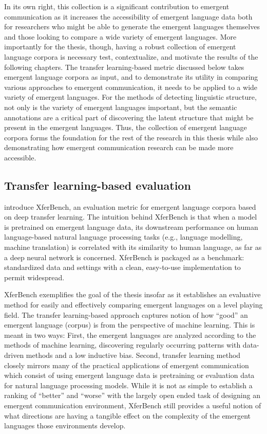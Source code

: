 In its own right, this collection is a significant contribution to emergent communication as it increases the accessibility of emergent language data both for researchers who might be able to generate the emergent languages themselves and those looking to compare a wide variety of emergent languages.
More importantly for the thesis, though, having a robust collection of emergent language corpora is necessary test, contextualize, and motivate the results of the following chapters.
The transfer learning-based metric discussed below takes emergent language corpora as input, and to demonstrate its utility in comparing various approaches to emergent communication, it needs to be applied to a wide variety of emergent languages.
For the methods of detecting linguistic structure, not only is the variety of emergent languages important, but the semantic annotations are a critical part of discovering the latent structure that might be present in the emergent languages.
Thus, the collection of emergent language corpora forms the foundation for the rest of the research in this thesis while also demonstrating how emergent communication research can be made more accessible.

\subsection{Transfer learning-based evaluation}

 introduce XferBench, an evaluation metric for emergent language corpora based on deep transfer learning.
The intuition behind XferBench is that when a model is pretrained on emergent language data, its downstream performance on human language-based natural language processing tasks (e.g., language modelling, machine translation) is correlated with its similarity to human language, as far as a deep neural network is concerned.
XferBench is packaged as a benchmark: standardized data and settings with a clean, easy-to-use implementation to permit widespread.

XferBench exemplifies the goal of the thesis insofar as it establishes an evaluative method for easily and effectively comparing emergent languages on a level playing field.
The transfer learning-based approach captures notion of how ``good'' an emergent language (corpus) is from the perspective of machine learning.
This is meant in two ways:
  First, the emergent languages are analyzed according to the methods of machine learning, discovering regularly occurring patterns with data-driven methods and a low inductive bias.
  Second, transfer learning method closely mirrors many of the practical applications of emergent communication which consist of using emergent language data is pretraining or evaluation data for natural language processing models.
While it is not as simple to establish a ranking of ``better'' and ``worse'' with the largely open ended task of designing an emergent communication environment, XferBench still provides a useful notion of what directions are having a tangible effect on the complexity of the emergent languages those environments develop.


